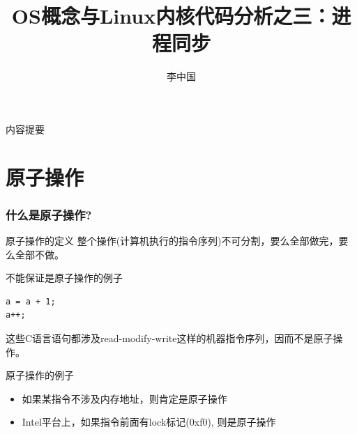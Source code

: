 \documentclass[xcolor=svgnames]{beamer}
\begin{document}
\begin{CJK*}{UTF8}{gbsn}


\title{OS概念与Linux内核代码分析之三：进程同步}
\author{李中国}

\begin{frame}
\maketitle
\end{frame}

\begin{frame}{内容提要}
\tableofcontents[pausesections]
\end{frame}

\section{原子操作}

\begin{frame}[fragile]%
\frametitle{什么是原子操作?}
\begin{block}{原子操作的定义}
整个操作(计算机执行的指令序列)不可分割，要么全部做完，要么全部不做。
\end{block}
\begin{block}{不能保证是原子操作的例子}
\begin{verbatim}
a = a + 1;
a++;
\end{verbatim}
这些C语言语句都涉及read-modify-write这样的机器指令序列，因而不是原子操作。
\end{block}
\begin{block}{原子操作的例子}
\begin{itemize}
\item 如果某指令不涉及内存地址，则肯定是原子操作
\item Intel平台上，如果指令前面有lock标记(0xf0), 则是原子操作
\end{itemize}
\end{block}
\end{frame}

\end{CJK*}
\end{document}
